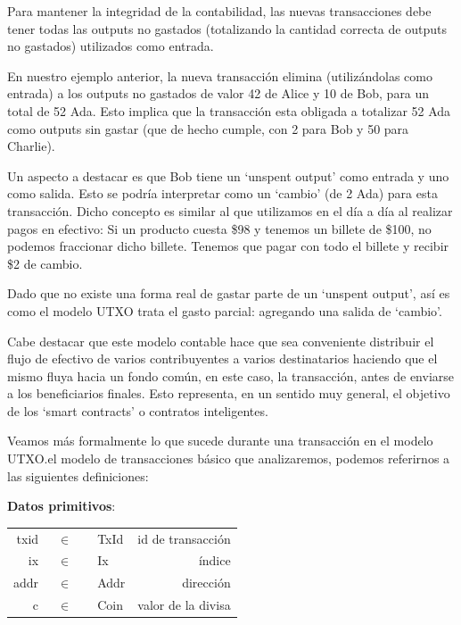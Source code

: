 \documentclass[12pt]{book}
\begin{document}
Para mantener la integridad de la contabilidad, las nuevas transacciones debe tener todas las outputs no gastados (totalizando la cantidad correcta de outputs no gastados) utilizados como entrada.

En nuestro ejemplo anterior, la nueva transacción elimina (utilizándolas como entrada) a los outputs no gastados de valor 42 de Alice y 10 de Bob, para un total de 52 Ada. Esto implica que la transacción esta obligada a totalizar 52 Ada como outputs sin gastar (que de hecho cumple, con 2 para Bob y 50 para Charlie).

Un aspecto a destacar es que Bob tiene un `unspent output' como entrada y uno como salida. Esto se podría interpretar como un `cambio' (de 2 Ada) para esta transacción. Dicho concepto es similar al que utilizamos en el día a día al realizar pagos en efectivo: Si un producto cuesta \$98 y tenemos un billete de \$100, no podemos fraccionar dicho billete. Tenemos que pagar con todo el billete y recibir \$2 de cambio.

Dado que no existe una forma real de gastar parte de un `unspent output', así es como el modelo UTXO trata el gasto parcial: agregando una salida de `cambio'.

Cabe destacar que este modelo contable hace que sea conveniente distribuir el flujo de efectivo de varios contribuyentes a varios destinatarios haciendo que el mismo fluya hacia un fondo común, en este caso, la transacción, antes de enviarse a los beneficiarios finales. Esto representa, en un sentido muy general, el objetivo de los `smart contracts' o contratos inteligentes.

Veamos más formalmente lo que sucede durante una transacción en el modelo UTXO.\@Para el modelo de transacciones básico que analizaremos, podemos referirnos a las siguientes definiciones:

\textbf{Datos primitivos}:

\begin{center}
	\begin{tabular}{ r @{} c @{} l r }
		txid & \ $\in$\ \  & TxId & id de transacción  \\
		ix   & \ $\in$\ \  & Ix   & índice             \\
		addr & \ $\in$\ \  & Addr & dirección          \\
		c    & \ $\in$\ \  & Coin & valor de la divisa \\
	\end{tabular}
\end{center}
\end{document}
